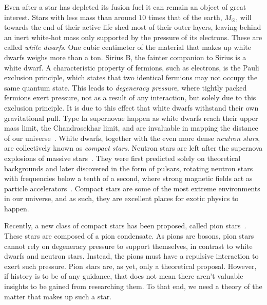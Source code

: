 Even after a star has depleted its fusion fuel it can remain an object of great interest.
Stars with less mass than around $10$ times that of the earth, $M_\odot$, will towards the end of their active life shed most of their outer layers, leaving behind an inert white-hot mass only supported by the pressure of its electrons.
These are called \emph{white dwarfs}.
One cubic centimeter of the material that makes up white dwarfs weighs more than a ton.
Sirius B, the fainter companion to Sirius is a white dwarf.
A characteristic property of fermions, such as electrons, is the Pauli exclusion principle, which states that two identical fermions may not occupy the same quantum state.
This leads to \emph{degeneracy pressure}, where tightly packed fermions exert pressure, not as a result of any interaction, but solely due to this exclusion principle.
It is due to this effect that white dwarfs withstand their own gravitational pull.
Type Ia supernovae happen as white dwarfs reach their upper mass limit, the Chandrasekhar limit, and are invaluable in mapping the distance of our universe~\autocite{carrollSpacetimeGeometryIntroduction2019}.
White dwarfs, together with the even more dense \emph{neutron stars}, are collectively known as \emph{compact stars}.
Neutron stars are left after the supernova explosions of massive stars~\autocite{prialnikIntroductionTheoryStellar2000}.
They were first predicted solely on theoretical backgrounds and later discovered in the form of pulsars, rotating neutron stars with frequencies below a tenth of a second, where strong magnetic fields act as particle accelerators~\autocite{prialnikIntroductionTheoryStellar2000}.
Compact stars are some of the most extreme environments in our universe, and as such, they are excellent places for exotic physics to happen.

Recently, a new class of compact stars has been proposed, called pion stars~\autocite{andersenBoseEinsteinCondensationPion2018,brandtNewClassCompact2018,carignanoScrutinizingPionCondensed2017}.
These stars are composed of a pion condensate.
As pions are bosons, pion stars cannot rely on degeneracy pressure to support themselves, in contrast to white dwarfs and neutron stars.
Instead, the pions must have a repulsive interaction to exert such pressure.
Pion stars are, as yet, only a theoretical proposal.
However, if history is to be of any guidance, that does not mean there aren't valuable insights to be gained from researching them.
To that end, we need a theory of the matter that makes up such a star.




